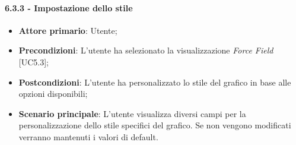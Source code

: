 \paragraph{6.3.3 - Impostazione dello stile}
\begin{itemize}
	\item \textbf{Attore primario}: Utente;
	\item \textbf{Precondizioni}: L'utente ha selezionato la visualizzazione \textit{Force Field} [UC5.3];
	\item \textbf{Postcondizioni}: L'utente ha personalizzato lo stile del grafico in base alle opzioni disponibili;
	
	\item \textbf{Scenario principale}: L'utente visualizza diversi campi per la personalizzazione dello stile specifici del grafico. Se non vengono modificati verranno mantenuti i valori di default. 
\end{itemize}